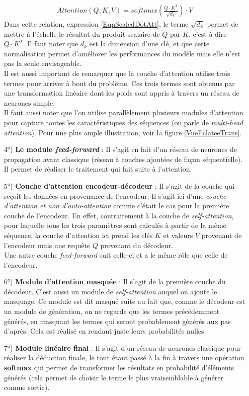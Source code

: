 \begin{itemize}
\begin{eqnarray}\label{EqnScaledDotAtt}
Attention(Q,K,V) = softmax\left( \frac{Q\cdot K^{T}}{\sqrt{d_{k}}} \right)\cdot V
\end{eqnarray}
Dans cette relation, expression \ref{EqnScaledDotAtt}, le terme $ \sqrt{d_{k}} $ permet de mettre à l'échelle le résultat du produit scalaire de $ Q $ par $ K $, c'est-à-dire $ Q\cdot K^{T} $. Il faut noter que $ d_{k} $ est la dimension d'une clé, et que cette normalisation permet d'améliorer les performances du modèle mais elle n'est pas la seule envisageable.\\
Il est aussi important de remarquer que la couche d'attention utilise trois termes pour arriver à bout du problème. Ces trois termes sont obtenus par une transformation linéaire dont les poids sont appris à travers un réseau de neurones simple.\\
Il faut aussi noter que l'on utilise parallèlement plusieurs modules d'attention pour capture toutes les caractéristiques des séquences (on parle de \textit{multi-head attention}). Pour une plus ample illustration, voir la figure \ref{VueEclateeTrans}.
\item[4°)] \textbf{Le module \textit{feed-forward}} : Il s'agit en fait d'un réseau de neurones de propagation avant classique (réseau à couches ajoutées de façon séquentielle). Il permet de réaliser le traitement qui fait suite à l'attention.
\item[5°)] \textbf{Couche d'attention encodeur-décodeur} : Il s'agit de la couche qui reçoit les données en provenance de l'encodeur. Il s'agit ici d'une \textit{couche d'attention et non d'auto-attention} comme c'était le cas pour la première couche de l'encodeur. En effet, contrairement à la couche de \textit{self-attention}, pour laquelle tous les trois paramètres sont calculés à partir de la même séquence, la couche d'attention ici prend les clés $ K $ et valeurs $ V $ provenant de l'encodeur mais une requête $ Q $ provenant du décodeur.\\
Une autre couche \textit{feed-forward} suit celle-ci et a le même rôle que celle de l'encodeur.
\item[6°)] \textbf{Module d'attention masquée} : Il s'agit de la première couche du décodeur. C'est aussi un module de \textit{self-attention} auquel on ajoute le masquage. Ce module est dit masqué suite au fait que, comme le décodeur est un module de génération, on ne regarde que les termes précédemment générés, en masquant les termes qui seront probablement générés aux pas d'après. Cela est réalisé en rendant juste leurs probabilités nulles.
\item[7°)] \textbf{Module linéaire final} : Il s'agit d'un réseau de neurones classique pour réaliser la déduction finale, le tout étant passé à la fin à travers une opération \textbf{softmax} qui permet de transformer les résultats en probabilité d'éléments générés (cela permet de choisir le terme le plus vraisemblable à générer comme sortie).
\end{itemize}
